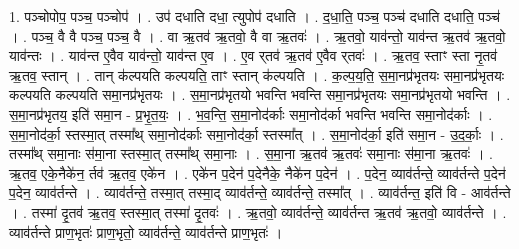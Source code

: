 \documentclass[17pt]{extarticle}
\begin{document}
1. पञ्चोपोप॒ पञ्च॒ पञ्चोप॑ । . उप॑ दधाति दधा॒ त्युपोप॑ दधाति । . द॒धा॒ति॒ पञ्च॒ पञ्च॑ दधाति दधाति॒ पञ्च॑ । . पञ्च॒ वै वै पञ्च॒ पञ्च॒ वै । . वा ऋ॒तव॑ ऋ॒तवो॒ वै वा ऋ॒तवः॑ । . ऋ॒तवो॒ याव॑न्तो॒ याव॑न्त ऋ॒तव॑ ऋ॒तवो॒ याव॑न्तः । . याव॑न्त ए॒वैव याव॑न्तो॒ याव॑न्त ए॒व । . ए॒व र्‌तव॑ ऋ॒तव॑ ए॒वैव र्‌तवः॑ । . ऋ॒तव॒ स्ताꣳ स्ता नृ॒तव॑ ऋ॒तव॒ स्तान् । . तान् क॑ल्पयति कल्पयति॒ ताꣳ स्तान् क॑ल्पयति । . क॒ल्प॒य॒ति॒ स॒मा॒नप्र॑भृतयः समा॒नप्र॑भृतयः कल्पयति कल्पयति समा॒नप्र॑भृतयः । . स॒मा॒नप्र॑भृतयो भवन्ति भवन्ति समा॒नप्र॑भृतयः समा॒नप्र॑भृतयो भवन्ति । . स॒मा॒नप्र॑भृतय॒ इति॑ समा॒न - प्र॒भृ॒त॒यः॒ । . भ॒व॒न्ति॒ स॒मा॒नोद॑र्काः समा॒नोद॑र्का भवन्ति भवन्ति समा॒नोद॑र्काः । . स॒मा॒नोद॑र्का॒ स्तस्मा॒त् तस्मा᳚थ् समा॒नोद॑र्काः समा॒नोद॑र्का॒ स्तस्मा᳚त् । . स॒मा॒नोद॑र्का॒ इति॑ समा॒न - उ॒द॒र्काः॒ । . तस्मा᳚थ् समा॒नाः स॑मा॒ना स्तस्मा॒त् तस्मा᳚थ् समा॒नाः । . स॒मा॒ना ऋ॒तव॑ ऋ॒तवः॑ समा॒नाः स॑मा॒ना ऋ॒तवः॑ । . ऋ॒तव॒ एके॒नैके॑न॒ र्तव॑ ऋ॒तव॒ एके॑न । . एके॑न प॒देन॑ प॒देनैके॒ नैके॑न प॒देन॑ । . प॒देन॒ व्याव॑र्तन्ते॒ व्याव॑र्तन्ते प॒देन॑ प॒देन॒ व्याव॑र्तन्ते । . व्याव॑र्तन्ते॒ तस्मा॒त् तस्मा॒द् व्याव॑र्तन्ते॒ व्याव॑र्तन्ते॒ तस्मा᳚त् । . व्याव॑र्तन्त॒ इति॑ वि - आव॑र्तन्ते । . तस्मा॑ दृ॒तव॑ ऋ॒तव॒ स्तस्मा॒त् तस्मा॑ दृ॒तवः॑ । . ऋ॒तवो॒ व्याव॑र्तन्ते॒ व्याव॑र्तन्त ऋ॒तव॑ ऋ॒तवो॒ व्याव॑र्तन्ते । . व्याव॑र्तन्ते प्राण॒भृतः॑ प्राण॒भृतो॒ व्याव॑र्तन्ते॒ व्याव॑र्तन्ते प्राण॒भृतः॑ । \newline
\end{document}
